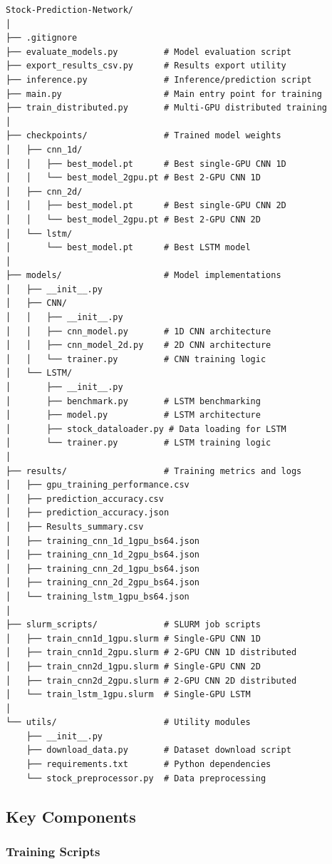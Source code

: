 \documentclass[sigconf]{acmart}
\begin{document}
\begin{verbatim}
Stock-Prediction-Network/
│
├── .gitignore
├── evaluate_models.py         # Model evaluation script
├── export_results_csv.py      # Results export utility
├── inference.py               # Inference/prediction script
├── main.py                    # Main entry point for training
├── train_distributed.py       # Multi-GPU distributed training
│
├── checkpoints/               # Trained model weights
│   ├── cnn_1d/
│   │   ├── best_model.pt      # Best single-GPU CNN 1D
│   │   └── best_model_2gpu.pt # Best 2-GPU CNN 1D
│   ├── cnn_2d/
│   │   ├── best_model.pt      # Best single-GPU CNN 2D
│   │   └── best_model_2gpu.pt # Best 2-GPU CNN 2D
│   └── lstm/
│       └── best_model.pt      # Best LSTM model
│
├── models/                    # Model implementations
│   ├── __init__.py
│   ├── CNN/
│   │   ├── __init__.py
│   │   ├── cnn_model.py       # 1D CNN architecture
│   │   ├── cnn_model_2d.py    # 2D CNN architecture
│   │   └── trainer.py         # CNN training logic
│   └── LSTM/
│       ├── __init__.py
│       ├── benchmark.py       # LSTM benchmarking
│       ├── model.py           # LSTM architecture
│       ├── stock_dataloader.py # Data loading for LSTM
│       └── trainer.py         # LSTM training logic
│
├── results/                   # Training metrics and logs
│   ├── gpu_training_performance.csv
│   ├── prediction_accuracy.csv
│   ├── prediction_accuracy.json
│   ├── Results_summary.csv
│   ├── training_cnn_1d_1gpu_bs64.json
│   ├── training_cnn_1d_2gpu_bs64.json
│   ├── training_cnn_2d_1gpu_bs64.json
│   ├── training_cnn_2d_2gpu_bs64.json
│   └── training_lstm_1gpu_bs64.json
│
├── slurm_scripts/             # SLURM job scripts
│   ├── train_cnn1d_1gpu.slurm # Single-GPU CNN 1D
│   ├── train_cnn1d_2gpu.slurm # 2-GPU CNN 1D distributed
│   ├── train_cnn2d_1gpu.slurm # Single-GPU CNN 2D
│   ├── train_cnn2d_2gpu.slurm # 2-GPU CNN 2D distributed
│   └── train_lstm_1gpu.slurm  # Single-GPU LSTM
│
└── utils/                     # Utility modules
    ├── __init__.py
    ├── download_data.py       # Dataset download script
    ├── requirements.txt       # Python dependencies
    └── stock_preprocessor.py  # Data preprocessing
\end{verbatim}

\subsection{Key Components}

\subsubsection{Training Scripts}
\end{document}

